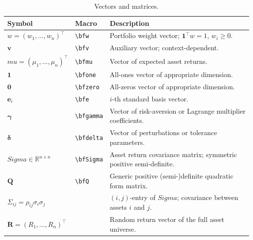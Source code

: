 \documentclass[12pt,openany]{book}
\newcommand{\R}{\mathbb{R}}
\newcommand{\bfw}{\mathbf{w}}
\newcommand{\bfv}{\mathbf{v}}
\newcommand{\bfmu}{\boldsymbol{\mu}}
\newcommand{\bfSigma}{\boldsymbol{\Sigma}}
\newcommand{\bfQ}{\mathbf{Q}}
\newcommand{\bfe}{\mathbf{e}}
\newcommand{\bfone}{\mathbf{1}}
\newcommand{\bfgamma}{\boldsymbol{\gamma}}
\newcommand{\bfdelta}{\boldsymbol{\delta}}
\newcommand{\bfzero}{\mathbf{0}}
\numberwithin{equation}{chapter}
\theoremstyle{plain}
\theoremstyle{definition}
\theoremstyle{remark}
\renewcommand{\arraystretch}{1.2}
\def\bfw{w}%
\def\bfmu{mu}%
\def\bfSigma{Sigma}%
\begin{document}
\begin{table}[H]
\renewcommand{\arraystretch}{1.35}
\caption{Vectors and matrices.}
\label{tab:symbols-vectors}
\begin{tabularx}{\linewidth}{@{} l l X @{}}
\toprule
\textbf{Symbol} & \textbf{Macro} & \textbf{Description} \\
\midrule
$\bfw=(w_1,\ldots,w_n)^\top$ & \texttt{\textbackslash bfw} &
  Portfolio weight vector; $\bfone^\top\bfw=1$, $w_i\geq0$. \\
$\bfv$ & \texttt{\textbackslash bfv} &
  Auxiliary vector; context-dependent. \\
$\bfmu=(\mu_1,\ldots,\mu_n)^\top$ & \texttt{\textbackslash bfmu} &
  Vector of expected asset returns. \\
$\bfone$ & \texttt{\textbackslash bfone} &
  All-ones vector of appropriate dimension. \\
$\bfzero$ & \texttt{\textbackslash bfzero} &
  All-zeros vector of appropriate dimension. \\
$\bfe_i$ & \texttt{\textbackslash bfe} &
  $i$-th standard basis vector. \\
$\bfgamma$ & \texttt{\textbackslash bfgamma} &
  Vector of risk-aversion or Lagrange multiplier coefficients. \\
$\bfdelta$ & \texttt{\textbackslash bfdelta} &
  Vector of perturbations or tolerance parameters. \\
$\bfSigma\in\R^{n\times n}$ & \texttt{\textbackslash bfSigma} &
  Asset return covariance matrix; symmetric positive semi-definite. \\
$\bfQ$ & \texttt{\textbackslash bfQ} &
  Generic positive (semi-)definite quadratic form matrix. \\
$\Sigma_{ij}=\rho_{ij}\sigma_i\sigma_j$ & &
  $(i,j)$-entry of $\bfSigma$; covariance between assets $i$ and $j$. \\
$\mathbf{R}=(R_1,\ldots,R_n)^\top$ & &
  Random return vector of the full asset universe. \\
\bottomrule
\end{tabularx}
\end{table}
\end{document}

